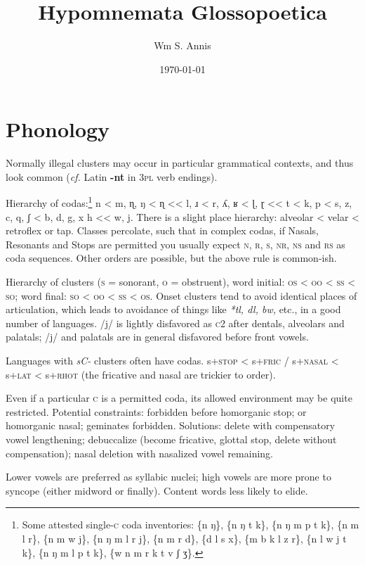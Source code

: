 \documentclass[11pt]{article}
\newcommand{\LL}[1]{\textbf{#1}}  %
\newcommand{\I}[1]{\textsc{#1}}   %
\begin{document}
\frenchspacing
\title{Hypomnemata Glossopoetica}
\author{Wm S. Annis}
\date{\today}
\maketitle

\section{Phonology}

Normally illegal clusters may occur in particular grammatical
contexts, and thus look common (\textit{cf.} Latin \LL{-nt} in \I{3pl}
verb endings).

Hierarchy of codas:\footnote{Some attested single-\I{c} coda
  inventories: \{n ŋ\}, \{n ŋ t k\}, \{n ŋ m p t k\}, \{n m l r\}, \{n
  m w j\}, \{n ŋ m l r j\}, \{n m r d\}, \{d l s x\}, \{m b k l z r\},
  \{n l w j t k\}, \{n ŋ m l p t k\}, \{w n m r k t v ʃ ʒ\}.} n < m,
ɳ, ŋ < ɳ << l, ɹ < r, ʎ, ʁ < ɭ, ɽ << t < k, p < s, z, c, q, ʃ < b, d,
g, x h << w, j.  There is a slight place hierarchy: alveolar < velar <
retroflex or tap.  Classes percolate, such that in complex codas, if
Nasals, Resonants and Stops are permitted you usually expect \I{n, r,
  s, nr, ns} and \I{rs} as coda sequences.  Other orders are possible,
but the above rule is common-ish.

Hierarchy of clusters (\I{s} = sonorant, \I{o} = obstruent), word
initial: \I{os} < \I{oo} < \I{ss} < \I{so}; word final: \I{so} <
\I{oo} < \I{ss} < \I{os}.  Onset clusters tend to avoid identical
places of articulation, which leads to avoidance of things like
\textit{*tl, dl, bw,} etc., in a good number of languages. /j/ is
lightly disfavored as \I{c2} after dentals, alveolars and palatals;
/j/ and palatals are in general disfavored before front vowels.

Languages with \textit{sC-} clusters often have codas.  s+\I{stop} <
s+\I{fric} / s+\I{nasal} < s+\I{lat} < s+\I{rhot} (the fricative and
nasal are trickier to order).

Even if a particular \I{c} is a permitted coda, its allowed
environment may be quite restricted. Potential constraints: forbidden
before homorganic stop; or homorganic nasal; geminates
forbidden. Solutions: delete with compensatory vowel lengthening;
debuccalize (become fricative, glottal stop, delete without
compensation); nasal deletion with nasalized vowel remaining.

Lower vowels are preferred as syllabic nuclei; high vowels are more
prone to syncope (either midword or finally).  Content words less
likely to elide.
\end{document}
